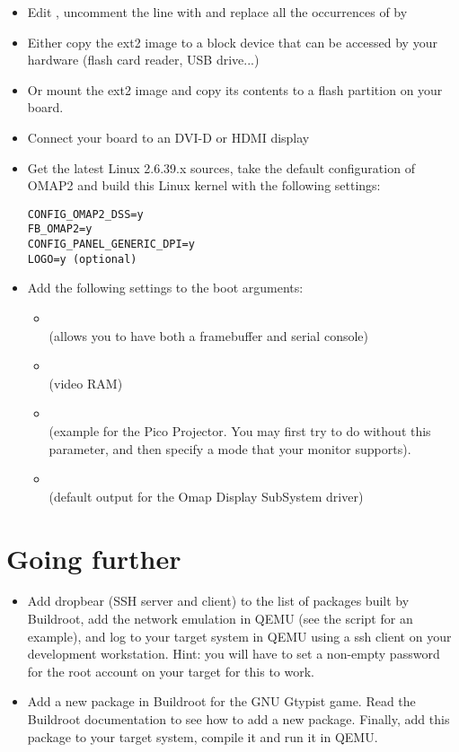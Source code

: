 \begin{itemize}
\item Edit , uncomment the line with 
  and replace all the occurrences of  by 
\item Either copy the ext2 image to a block device that can be
  accessed by your hardware (flash card reader, USB drive...)
\item Or mount the ext2 image and copy its contents to a flash
  partition on your board.
\item Connect your board to an DVI-D or HDMI display
\item Get the latest Linux 2.6.39.x sources, take the default
  configuration of OMAP2 and build this Linux kernel with the
  following settings:
\begin{verbatim}
CONFIG_OMAP2_DSS=y
FB_OMAP2=y
CONFIG_PANEL_GENERIC_DPI=y
LOGO=y (optional)
\end{verbatim}
\item Add the following settings to the boot arguments:
  \begin{itemize}
  \item {}\\(allows you to have both a framebuffer
    and serial console)
  \item {}\\(video RAM)
  \item {}\\(example for the
    Pico Projector. You may first try to do without this parameter,
    and then specify a mode that your monitor supports).
  \item {}\\(default output for the Omap
    Display SubSystem driver)
  \end{itemize}
\end{itemize}

\section{Going further}

\begin{itemize}

\item Add dropbear (SSH server and client) to the list of packages
  built by Buildroot, add the network emulation in QEMU (see the
   script for an example), and log to
  your target system in QEMU using a ssh client on your development
  workstation. Hint: you will have to set a non-empty password for the
  root account on your target for this to work.

\item Add a new package in Buildroot for the GNU Gtypist game. Read
  the Buildroot documentation to see how to add a new
  package. Finally, add this package to your target system, compile it
  and run it in QEMU.

\end{itemize}

